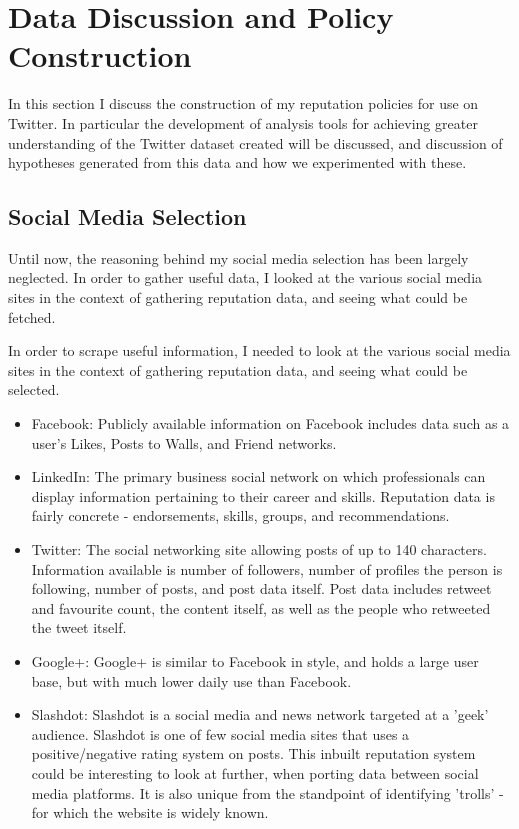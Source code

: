 \chapter{Data Discussion and Policy Construction}\label{C:us}

In this section I discuss the construction of my reputation policies for use on Twitter. In particular the development of analysis tools for achieving greater understanding of the Twitter dataset created will be discussed, and discussion of hypotheses generated from this data and how we experimented with these. %

\section{Social Media Selection}

Until now, the reasoning behind my social media selection has been largely neglected. In order to gather useful data, I looked at the various social media sites in the context of gathering reputation data, and seeing what could be fetched. %

In order to scrape useful information, I needed to look at the various social media sites in the context of gathering reputation data, and seeing what could be selected. 

\begin{itemize}

\item Facebook: Publicly available information on Facebook includes data such as a user's Likes, Posts to Walls, and Friend networks. 
\item LinkedIn: The primary business social network on which professionals can display information pertaining to their career and skills. Reputation data is fairly concrete - endorsements, skills, groups, and recommendations. 
\item Twitter: The social networking site allowing posts of up to 140 characters. Information available is number of followers, number of profiles the person is following, number of posts, and post data itself. Post data includes retweet and favourite count, the content itself, as well as the people who retweeted the tweet itself. 
\item Google+: Google+ is similar to Facebook in style, and holds a large user base, but with much lower daily use than Facebook.
\item Slashdot: Slashdot is a social media and news network targeted at a 'geek' audience. Slashdot is one of few social media sites that uses a positive/negative rating system on posts. This inbuilt reputation system could be interesting to look at further, when porting data between social media platforms. It is also unique from the standpoint of identifying 'trolls' - for which the website is widely known. 
\end{itemize}

